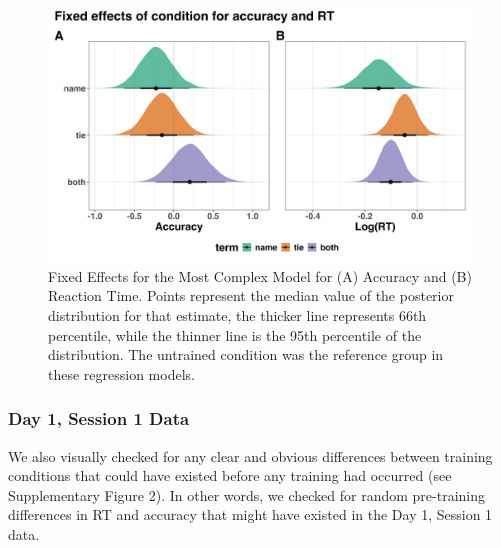 \documentclass[
  man,floatsintext]{apa6}
\begin{document}
\begin{figure}[H]

{\centering \includegraphics[height=0.67\textheight,]{../../figures/manifest/fixef} 

}

\caption{Fixed Effects for the Most Complex Model for (A) Accuracy and (B) Reaction Time. Points represent the median value of the posterior distribution for that estimate, the thicker line represents 66th percentile, while the thinner line is the 95th percentile of the distribution. The untrained condition was the reference group in these regression models.}\label{fig:fixef-plot}
\end{figure}

\subsubsection{Day 1, Session 1 Data}\label{day-1-session-1-data}

We also visually checked for any clear and obvious differences between training conditions that could have existed before any training had occurred (see Supplementary Figure 2).
In other words, we checked for random pre-training differences in RT and accuracy that might have existed in the Day 1, Session 1 data.
\end{document}
